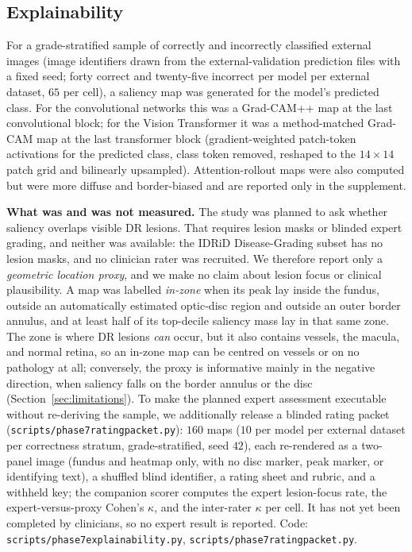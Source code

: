 \documentclass[journal]{IEEEtran}
\renewcommand{\_}{\origunderscore\allowbreak}
\begin{document}
\subsection{Explainability}
\label{sec:methods-explain}

For a grade-stratified sample of correctly and incorrectly classified external
images (image identifiers drawn from the external-validation prediction files with
a fixed seed; forty correct and twenty-five incorrect per model per external
dataset, $65$ per cell), a saliency map was generated for the model's predicted
class. For the
convolutional networks this was a Grad-CAM++ map
\cite{chattopadhay2018gradcampp} at the last convolutional block; for the Vision
Transformer it was a method-matched Grad-CAM map at the last transformer block
(gradient-weighted patch-token activations for the predicted class, class token
removed, reshaped to the $14\times14$ patch grid and bilinearly upsampled).
Attention-rollout maps \cite{abnar2020rollout} were also computed but were more
diffuse and border-biased and are reported only in the supplement.

\textbf{What was and was not measured.} The study was planned to ask whether
saliency overlaps visible DR lesions. That requires lesion masks or blinded
expert grading, and neither was available: the IDRiD Disease-Grading subset has
no lesion masks, and no clinician rater was recruited. We therefore report only
a \emph{geometric location proxy}, and we make no claim about lesion focus or
clinical plausibility. A map was labelled \emph{in-zone} when its peak lay
inside the fundus, outside an automatically estimated optic-disc region and
outside an outer border annulus, and at least half of its top-decile saliency
mass lay in that same zone. The zone is where DR lesions \emph{can} occur, but it
also contains vessels, the macula, and normal retina, so an in-zone map can be
centred on vessels or on no pathology at all; conversely, the proxy is
informative mainly in the negative direction, when saliency falls on the border
annulus or the disc (Section~\ref{sec:limitations}). To make the planned expert
assessment executable without
re-deriving the sample, we additionally release a blinded rating packet
(\texttt{scripts/\allowbreak{}phase7\_rating\_packet.py}): $160$ maps ($10$ per model per
external dataset per correctness stratum, grade-stratified, seed $42$), each
re-rendered as a two-panel image (fundus and heatmap only, with no disc marker,
peak marker, or identifying text), a shuffled blind identifier, a rating sheet
and rubric, and a withheld key; the companion scorer computes the expert
lesion-focus rate, the expert-versus-proxy Cohen's $\kappa$, and the
inter-rater $\kappa$ per cell. It has not yet been completed by clinicians, so
no expert result is reported. Code:
\texttt{scripts/\allowbreak{}phase7\_explainability.py},
\texttt{scripts/\allowbreak{}phase7\_rating\_packet.py}.
\end{document}
